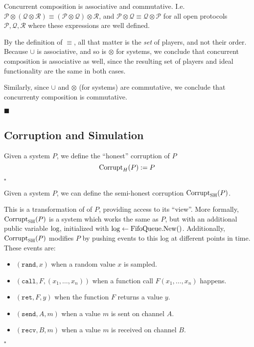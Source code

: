 \begin{lemma}
Concurrent composition is associative and commutative.
I.e. $\mathcal{P} \otimes (\mathcal{Q} \otimes \mathcal{R}) \equiv (\mathcal{P} \otimes \mathcal{Q}) \otimes \mathcal{R}$,
and $\mathcal{P} \otimes \mathcal{Q} \equiv \mathcal{Q} \otimes \mathcal{P}$ for
all open protocols $\mathcal{P}, \mathcal{Q}, \mathcal{R}$ where these expressions
are well defined.


By the definition of $\equiv$, all that matter is the \emph{set} of players,
and not their order.
Because $\cup$ is associative, and so is $\otimes$ for systems,
we conclude that concurrent composition is associative as well,
since the resulting set of players and ideal functionality are the same
in both cases.

Similarly, since $\cup$ and $\otimes$ (for systems) are commutative,
we conclude that concurrenty composition is commutative.

$\blacksquare$
\end{lemma}

\subsection{Corruption and Simulation}

\begin{definition}
Given a system $P$,
we define the ``honest'' corruption of $P$
$$
\text{Corrupt}_H(P) := P
$$

$\square$
\end{definition}

\begin{definition}
Given a system $P$, we can define
the semi-honest corruption $\text{Corrupt}_{\text{SH}}(P)$.

This is a transformation of
of $P$, providing access to its ``view''.
More formally, $\text{Corrupt}_{\text{SH}}(P)$ is a system which works the same
as $P$, but with an additional public variable $\text{log}$,
initialized with ${\text{log} \gets \text{FifoQueue.New()}}$.
Additionally, $\text{Corrupt}_{\text{SH}}(P)$ modifies $P$ by pushing events to this
log at different points in time.
These events are:
\begin{itemize}
\item $(\texttt{rand}, x)$ when a random value $x$ is sampled.
\item $(\texttt{call}, F, (x_1, \ldots, x_n))$ when a function call $F(x_1, \ldots, x_n)$ happens.
\item $(\texttt{ret}, F, y)$ when the function $F$ returns a value $y$.
\item $(\texttt{send}, A, m)$ when a value $m$ is sent on channel $A$.
\item $(\texttt{recv}, B, m)$ when a value $m$ is received on channel $B$.
\end{itemize}

$\square$
\end{definition}

